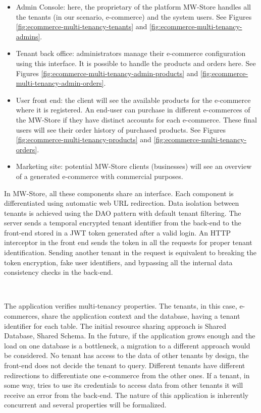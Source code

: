 \documentclass[12pt,english]{article} %
\begin{document}
\begin{itemize}
    \item Admin Console: here, the proprietary of the platform MW-Store handles all the tenants (in our scenario, e-commerce) and the system users.
    See Figures \ref{fig:ecommerce-multi-tenancy-tenants} and \ref{fig:ecommerce-multi-tenancy-admins}.
    \item Tenant back office: administrators manage their e-commerce configuration using this interface. It is possible to handle the products and orders here.
    See Figures \ref{fig:ecommerce-multi-tenancy-admin-products} and \ref{fig:ecommerce-multi-tenancy-admin-orders}.
    \item User front end: the client will see the available products for the e-commerce where it is registered.
    An end-user can purchase in different e-commerces of the MW-Store if they have distinct accounts for each e-commerce.
    These final users will see their order history of purchased products.
    See Figures \ref{fig:ecommerce-multi-tenancy-products} and \ref{fig:ecommerce-multi-tenancy-orders}.
    \item Marketing site: potential MW-Store clients (businesses) will see an overview of a generated e-commerce with commercial purposes.
\end{itemize}

In MW-Store, all these components share an interface.
Each component is differentiated using automatic web URL redirection.
Data isolation between tenants is achieved using the DAO pattern with default tenant filtering.
The server sends a temporal encrypted tenant identifier from the back-end to the front-end stored in a JWT token generated after a valid login.
An HTTP interceptor in the front end sends the token in all the requests for proper tenant identification.
Sending another tenant in the request is equivalent to breaking the token encryption, fake user identifiers, and bypassing all the internal data consistency checks in the back-end.

\

The application verifies multi-tenancy properties.
The tenants, in this case, e-commerces, share the application context and the database, having a tenant identifier for each table.
The initial resource sharing approach is Shared Database, Shared Schema.
In the future, if the application grows enough and the load on one database is a bottleneck, a migration to a different approach would be considered.
No tenant has access to the data of other tenants by design, the front-end does not decide the tenant to query.
Different tenants have different redirections to differentiate one e-commerce from the other ones.
If a tenant, in some way, tries to use its credentials to access data from other tenants it will receive an error from the back-end.
The nature of this application is inherently concurrent and several properties will be formalized.
\end{document}
